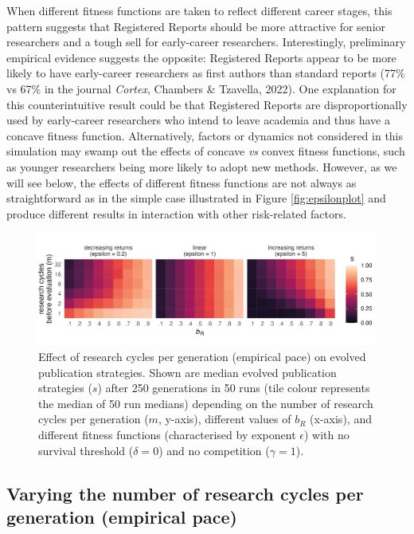 \documentclass[
  ,man,mask,floatsintext]{apa6}
\begin{document}
When different fitness functions are taken to reflect different career stages,
this pattern suggests that Registered Reports should be more attractive for senior researchers and a tough sell for early-career researchers.
Interestingly, preliminary empirical evidence suggests the opposite:
Registered Reports appear to be more likely to have early-career researchers as first authors than standard reports (77\% vs 67\% in the journal \emph{Cortex}, Chambers \& Tzavella, 2022).
One explanation for this counterintuitive result could be that Registered Reports are disproportionally used by early-career researchers who intend to leave academia and thus have a concave fitness function.
Alternatively, factors or dynamics not considered in this simulation may swamp out the effects of concave \emph{vs} convex fitness functions, such as younger researchers being more likely to adopt new methods.
However, as we will see below, the effects of different fitness functions are not always as straightforward as in the simple case illustrated in Figure \ref{fig:epsilonplot} and produce different results in interaction with other risk-related factors.



\begin{figure}

{\centering \includegraphics[width=1\linewidth]{../plots/plot_m_tile_evo} 

}

\caption{Effect of research cycles per generation (empirical pace) on evolved publication strategies. Shown are median evolved publication strategies (\(s\)) after 250 generations in 50 runs (tile colour represents the median of 50 run medians) depending on the number of research cycles per generation (\(m\), y-axis), different values of \(b_{R}\) (x-axis), and different fitness functions (characterised by exponent \(\epsilon\)) with no survival threshold (\(\delta = 0\)) and no competition (\(\gamma = 1\)).}\label{fig:mplot}
\end{figure}

\hypertarget{varying-the-number-of-research-cycles-per-generation-empirical-pace}{%
\subsection{Varying the number of research cycles per generation (empirical pace)}\label{varying-the-number-of-research-cycles-per-generation-empirical-pace}}
\end{document}
